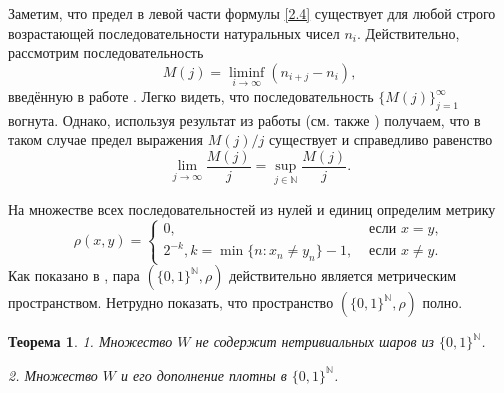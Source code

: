 \documentclass[12pt]{article}
\newtheorem{thm}{Теорема}
\def\N{{\mathbb{N}}}
\begin{document}
Заметим, что предел в левой части формулы \eqref{2.4} существует для любой строго возрастающей последовательности натуральных чисел $n_i$. Действительно,  рассмотрим последовательность
\begin{equation*}
\label{eq:definition_M_j}
M(j) = \liminf_{i\to\infty} (n_{i+j} - n_i),
\end{equation*}
введённую в работе \cite{Avdeev2019}. Легко видеть, что последовательность $\{M(j)\}_{j=1}^\infty$ вогнута. Однако, используя результат из работы \cite{Fekete} (см. также \cite[I, Задача 98]{polia1978zadachi}) получаем, что в таком случае предел выражения $M(j)/j$ существует и справедливо равенство
$$\lim_{j\to\infty}\frac{M(j)}{j} =\sup_{j\in\N}\frac{M(j)}{j}.$$



На множестве всех последовательностей из нулей и единиц определим метрику
$$
	\rho(x,y)=
	\begin{cases}
		0, & \mbox{~если~} x=y, \\
		2^{-k}, k = \min\{n:x_n \neq y_n\} - 1, & \mbox{~если~} x\neq y. %
	\end{cases}
$$
Как показано в \cite[Утверждение 2.1.8]{Edgar}, пара $(\{0,1\}^\N, \rho)$ действительно является метрическим пространством.
Нетрудно показать, что пространство $(\{0,1\}^\N, \rho)$ полно.


\begin{thm}
1. Множество $W$ не содержит нетривиальных шаров из $\{0,1\}^\N$.

2. Множество $W$ и его дополнение плотны в $\{0,1\}^\N$.
\end{thm}
\end{document}
